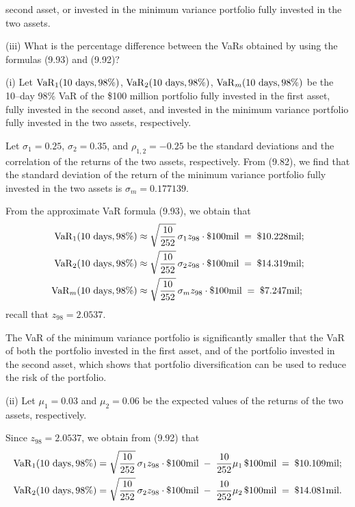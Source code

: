 second asset, or invested in the minimum variance portfolio fully invested in
the two assets.

(iii) What is the percentage difference between the VaRs obtained by using
the formulas (9.93) and (9.92)?

\begin{answerx}
(i) Let $\operatorname{VaR}_1(10\text{ days},98\%)$, $\operatorname{VaR}_2(10\text{ days},98\%)$,
$\operatorname{VaR}_m(10\text{ days},98\%)$ be the 10--day 98\% VaR of the \$100 million
portfolio fully invested in the first asset, fully invested in the second
asset, and invested in the minimum variance portfolio fully invested in the
two assets, respectively.

Let $\sigma_1 = 0.25$, $\sigma_2 = 0.35$, and $\rho_{1,2} = -0.25$ be the
standard deviations and the correlation of the returns of the two assets,
respectively. From (9.82), we find that the standard deviation of the return
of the minimum variance portfolio fully invested in the two assets is
$\sigma_m = 0.177139$.

From the approximate VaR formula (9.93), we obtain that
\[
\begin{aligned}
\operatorname{VaR}_1(10\text{ days},98\%) &\approx \sqrt{\frac{10}{252}}\,\sigma_1 z_{98}\cdot\$100\text{mil} \;=\; \$10.228\text{mil};\\
\operatorname{VaR}_2(10\text{ days},98\%) &\approx \sqrt{\frac{10}{252}}\,\sigma_2 z_{98}\cdot\$100\text{mil} \;=\; \$14.319\text{mil};\\
\operatorname{VaR}_m(10\text{ days},98\%) &\approx \sqrt{\frac{10}{252}}\,\sigma_m z_{98}\cdot\$100\text{mil} \;=\; \$7.247\text{mil};
\end{aligned}
\]
recall that $z_{98}=2.0537$.

The VaR of the minimum variance portfolio is significantly smaller that the
VaR of both the portfolio invested in the first asset, and of the portfolio
invested in the second asset, which shows that portfolio diversification can
be used to reduce the risk of the portfolio.

(ii) Let $\mu_1 = 0.03$ and $\mu_2 = 0.06$ be the expected values of the
returns of the two assets, respectively.

Since $z_{98} = 2.0537$, we obtain from (9.92) that
\[
\begin{aligned}
\operatorname{VaR}_1(10\text{ days},98\%) &= \sqrt{\frac{10}{252}}\,\sigma_1 z_{98}\cdot\$100\text{mil} \;-\; \frac{10}{252}\mu_1\,\$100\text{mil} \;=\; \$10.109\text{mil};\\
\operatorname{VaR}_2(10\text{ days},98\%) &= \sqrt{\frac{10}{252}}\,\sigma_2 z_{98}\cdot\$100\text{mil} \;-\; \frac{10}{252}\mu_2\,\$100\text{mil} \;=\; \$14.081\text{mil}.
\end{aligned}
\]


\end{answerx}
